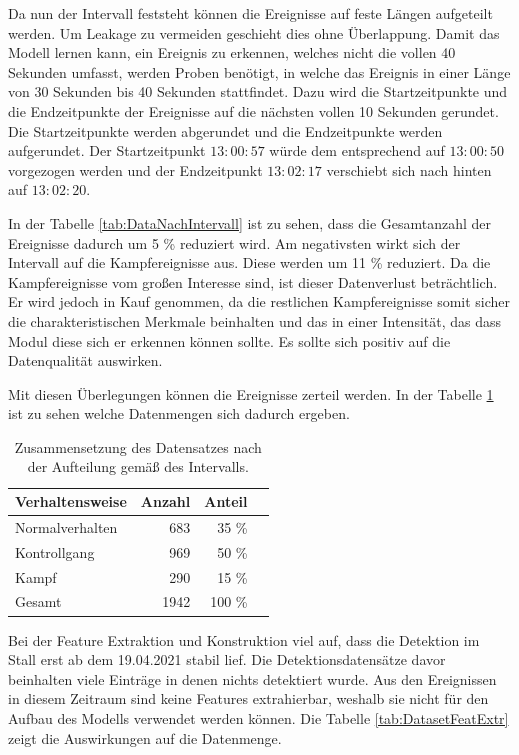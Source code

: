 Da nun der Intervall feststeht können die Ereignisse auf feste Längen aufgeteilt werden. Um \gls{Leakage} zu vermeiden geschieht dies ohne Überlappung. Damit das Modell lernen kann, ein Ereignis zu erkennen, welches nicht die vollen 40 Sekunden umfasst, werden Proben benötigt, in welche das Ereignis in einer Länge von 30 Sekunden bis 40 Sekunden stattfindet. Dazu wird die Startzeitpunkte und die Endzeitpunkte der Ereignisse auf die nächsten vollen 10 Sekunden gerundet. Die Startzeitpunkte werden abgerundet und die Endzeitpunkte werden aufgerundet. Der Startzeitpunkt \(13:00:57\) würde dem entsprechend auf \(13:00:50\) vorgezogen werden und der Endzeitpunkt \(13:02:17\) verschiebt sich nach hinten auf \(13:02:20\). \par

In der Tabelle \ref{tab:DataNachIntervall} ist zu sehen, dass die Gesamtanzahl der Ereignisse dadurch um 5 \% reduziert wird. Am negativsten wirkt sich der Intervall auf die Kampfereignisse aus. Diese werden um 11 \% reduziert. Da die Kampfereignisse vom großen Interesse sind, ist dieser Datenverlust beträchtlich. Er wird jedoch in Kauf genommen, da die restlichen Kampfereignisse somit sicher die charakteristischen Merkmale beinhalten und das in einer Intensität, das dass Modul diese sich er erkennen können sollte. Es sollte sich positiv auf die Datenqualität auswirken. \par

Mit diesen Überlegungen können die Ereignisse zerteil werden. In der Tabelle \ref{tab:DatasetSplit} ist zu sehen welche Datenmengen sich dadurch ergeben. 

\begin{table}[ht]
    \centering
    \caption{Zusammensetzung des Datensatzes nach der Aufteilung gemäß des Intervalls.}
    \begin{tabular}{|l|r|r|r|}
    \hline
        Verhaltensweise & Anzahl & Anteil \\
    \hline
        Normalverhalten & 683 & 35 \% \\
        Kontrollgang & 969 & 50 \% \\
        Kampf & 290 & 15 \% \\
    \hline
    \hline
        Gesamt & 1942 & 100 \%\\
    \hline
    \end{tabular}
    \label{tab:DatasetSplit}
\end{table}

Bei der Feature Extraktion und Konstruktion viel auf, dass die Detektion im Stall erst ab dem 19.04.2021 stabil lief. Die Detektionsdatensätze davor beinhalten viele Einträge in denen nichts detektiert wurde. Aus den Ereignissen in diesem Zeitraum sind keine Features extrahierbar, weshalb sie nicht für den Aufbau des Modells verwendet werden können. Die Tabelle \ref{tab:DatasetFeatExtr} zeigt die Auswirkungen auf die Datenmenge.

